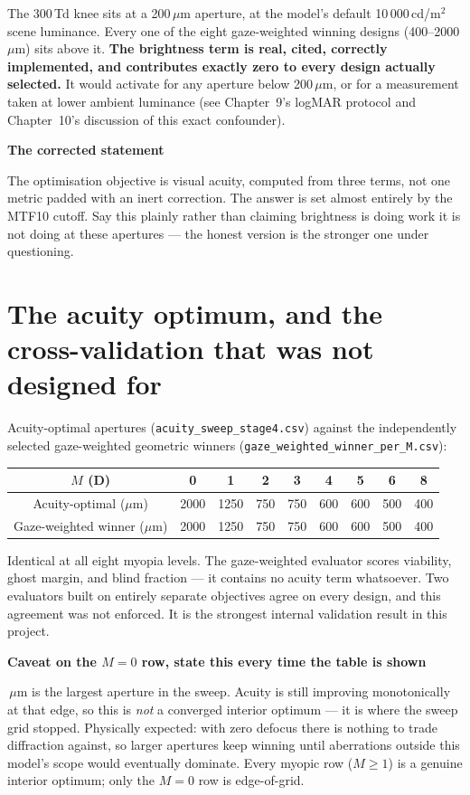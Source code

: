 \documentclass[11pt]{report}
\newenvironment{keybox}[1]%
{\par\vspace{6pt}\begin{lrbox}{\kbsave}\begin{minipage}{0.88\textwidth}%
{\bfseries\color{hbblue}#1}\par\vspace{4pt}\ignorespaces}%
{\end{minipage}\end{lrbox}%
\begin{center}\setlength{\fboxrule}{1.2pt}\setlength{\fboxsep}{7pt}%
\fcolorbox{hbblue}{boxgrey}{\usebox{\kbsave}}\end{center}\vspace{6pt}\par}
\newenvironment{warnbox}[1]%
{\par\vspace{6pt}\begin{lrbox}{\wbsave}\begin{minipage}{0.88\textwidth}%
{\bfseries\color{warnred}#1}\par\vspace{4pt}\ignorespaces}%
{\end{minipage}\end{lrbox}%
\begin{center}\setlength{\fboxrule}{1.2pt}\setlength{\fboxsep}{7pt}%
\fcolorbox{warnred}{white}{\usebox{\wbsave}}\end{center}\vspace{6pt}\par}
\begin{document}
The 300\,Td knee sits at a 200\,$\mu$m aperture, at the model's default 10\,000\,cd/m$^2$
scene luminance. Every one of the eight gaze-weighted winning designs (400--2000\,$\mu$m)
sits above it. \textbf{The brightness term is real, cited, correctly implemented, and
contributes exactly zero to every design actually selected.} It would activate for any
aperture below 200\,$\mu$m, or for a measurement taken at lower ambient luminance (see
Chapter~9's logMAR protocol and Chapter~10's discussion of this exact confounder).

\begin{keybox}{The corrected statement}
The optimisation objective is visual acuity, computed from three terms, not one metric
padded with an inert correction. The answer is set almost entirely by the MTF10 cutoff. Say
this plainly rather than claiming brightness is doing work it is not doing at these
apertures --- the honest version is the stronger one under questioning.
\end{keybox}

\section{The acuity optimum, and the cross-validation that was not designed for}

Acuity-optimal apertures (\texttt{acuity\_sweep\_stage4.csv}) against the independently
selected gaze-weighted geometric winners (\texttt{gaze\_weighted\_winner\_per\_M.csv}):

\begin{center}
\begin{tabular}{c|cccccccc}
\toprule
$M$ (D) & 0 & 1 & 2 & 3 & 4 & 5 & 6 & 8 \\
\midrule
Acuity-optimal ($\mu$m) & 2000 & 1250 & 750 & 750 & 600 & 600 & 500 & 400 \\
Gaze-weighted winner ($\mu$m) & 2000 & 1250 & 750 & 750 & 600 & 600 & 500 & 400 \\
\bottomrule
\end{tabular}
\end{center}

Identical at all eight myopia levels. The gaze-weighted evaluator scores viability, ghost
margin, and blind fraction --- it contains no acuity term whatsoever. Two evaluators built
on entirely separate objectives agree on every design, and this agreement was not enforced.
It is the strongest internal validation result in this project.

\begin{warnbox}{Caveat on the $M=0$ row, state this every time the table is shown}
2000\,$\mu$m is the largest aperture in the sweep. Acuity is still improving monotonically
at that edge, so this is \emph{not} a converged interior optimum --- it is where the sweep
grid stopped. Physically expected: with zero defocus there is nothing to trade diffraction
against, so larger apertures keep winning until aberrations outside this model's scope
would eventually dominate. Every myopic row ($M\geq1$) is a genuine interior optimum;
only the $M=0$ row is edge-of-grid.
\end{warnbox}
\end{document}
